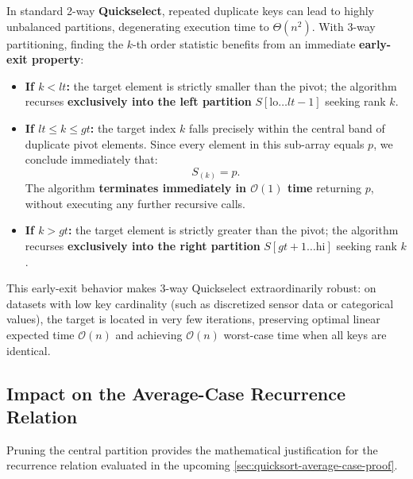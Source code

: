 In standard 2-way \textbf{Quickselect}, repeated duplicate keys can lead to highly unbalanced partitions, degenerating execution time to $\Theta(n^2)$. With 3-way partitioning, finding the $k$-th order statistic benefits from an immediate \textbf{early-exit property}:

\begin{itemize}
  \item \textbf{If $k < lt$:} the target element is strictly smaller than the pivot; the algorithm recurses \textbf{exclusively into the left partition} $S[\text{lo} \dots lt - 1]$ seeking rank $k$.
  \item \textbf{If $lt \le k \le gt$:} the target index $k$ falls precisely within the central band of duplicate pivot elements. Since every element in this sub-array equals $p$, we conclude immediately that:
  \begin{equation}
    S_{(k)} = p.
  \end{equation}
  The algorithm \textbf{terminates immediately in $\mathcal{O}(1)$ time} returning $p$, without executing any further recursive calls.
  \item \textbf{If $k > gt$:} the target element is strictly greater than the pivot; the algorithm recurses \textbf{exclusively into the right partition} $S[gt + 1 \dots \text{hi}]$ seeking rank $k$.
\end{itemize}

This early-exit behavior makes 3-way Quickselect extraordinarily robust: on datasets with low key cardinality (such as discretized sensor data or categorical values), the target is located in very few iterations, preserving optimal linear expected time $\mathcal{O}(n)$ and achieving $\mathcal{O}(n)$ worst-case time when all keys are identical.

\subsection{Impact on the Average-Case Recurrence Relation}
\label{subsec:3way-average-case-impact}

Pruning the central partition provides the mathematical justification for the recurrence relation evaluated in the upcoming \autoref{sec:quicksort-average-case-proof}.

